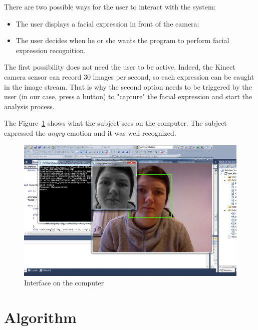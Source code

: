 \vspace{\baselineskip}
\noindent There are two possible ways for the user to interact with the system:
\begin{itemize}
  \item The user displays a facial expression in front of the camera;
  \item The user  decides when he or she wants the program to perform facial expression recognition.
\end{itemize}

\noindent The first possibility does not need the user to be active. Indeed, the Kinect camera sensor can record 30 images per second, so each expression can be caught in the image stream. That is why the second option needs to be triggered by the user (in our case, press a button) to "capture" the facial expression and start the analysis process. 
\newline

\noindent The Figure~\ref{interface_computer} shows what the subject sees on the computer. The subject expressed the \textit{angry} emotion and it was well recognized.
\newline

\begin{figure}[!h]
\begin{center}
\noindent \includegraphics[scale=0.4]{figures/interface_computer} 
\newline
\caption{Interface on the computer}
\label{interface_computer}
\end{center} 
\end{figure}

\section{Algorithm}

